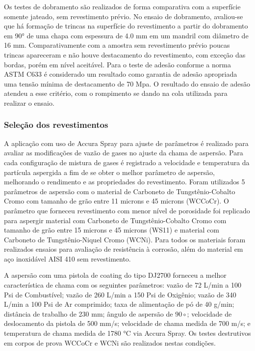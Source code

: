 Os testes de dobramento são realizados de forma comparativa com a
superfície somente jateado, sem revestimento prévio. No ensaio de dobramento,
avaliou-se que há formação de trincas na superfície do revestimento a partir
do dobramento em 90° de uma chapa com espessura de 4.0 mm em um mandril com
diâmetro de 16 mm. Comparativamente com a amostra sem revestimento prévio
poucas trincas apareceram e não houve destacamento do revestimento, com exceção
das bordas, porém em nível aceitável. Para o teste de adesão conforme a norma
ASTM C633 é considerado um resultado como garantia de adesão apropriada uma
tensão mínima de destacamento de 70 Mpa. O resultado do ensaio de adesão
atendeu a esse critério, com o rompimento se dando na cola utilizada para
realizar o ensaio.

\subsubsection{Seleção dos revestimentos}

A aplicação com uso de Accura Spray para ajuste de parâmetros é
realizado para avaliar as modificações de vazão de gases no ajuste da
chama de aspersão. Para cada configuração de mistura de gases é registrado a
velocidade e temperatura da partícula aspergida a fim de se obter o melhor
parâmetro de aspersão, melhorando o rendimento e as propriedades do
revestimento. Foram utilizados 5 parâmetros de aspersão com o material de
Carboneto de Tungstênio-Cobalto Cromo com tamanho de grão entre 11 microns e 45 microns
(WCCoCr). O parâmetro que forneceu revestimento com menor nível de porosidade
foi replicado para aspergir material com Carboneto de Tungstênio-Cobalto Cromo
com tamanho de grão entre 15 microns e 45 microns (WS11) e material com
Carboneto de Tungstênio-Niquel Cromo (WCNi). Para todos os materiais foram
realizados ensaios para avaliação de resistência à corrosão, além do material
em aço inoxidável AISI 410 sem revestimento.

A aspersão com uma pistola de coating do tipo DJ2700 forneceu a
melhor característica de chama com os seguintes parâmetros: vazão de 72 L/min a
100 Psi de Combustível; vazão de 260 L/min a 150 Psi de Oxigênio; vazão de 340
L/min a 100 Psi de Ar comprimido; taxa de alimentação de pó de 40 g/min;
distância de trabalho de 230 mm; ângulo de aspersão de $90\circ$; velocidade de
deslocamento da pistola de 500 mm/s; velocidade de chama medida de 700 m/s; e
temperatura de chama medida de 1780 °C via Accura Spray. Os testes destrutivos
em corpos de prova WCCoCr e WCNi são realizados nestas condições.

